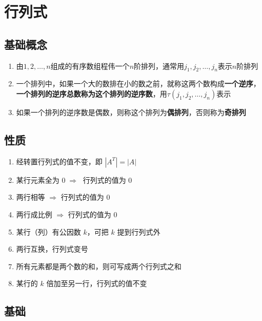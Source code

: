 \documentclass[a4paper,12pt]{article}
\begin{document}



    \section{行列式}

    \subsection{基础概念}
    \begin{enumerate}
        \item 由$1, 2, \dots, n$组成的有序数组程伟一个$n$阶排列，通常用$j_1, j_2, \dots, j_n$表示$n$阶排列
        \item 一个排列中，如果一个大的数排在小的数之前，就称这两个数构成\textbf{一个逆序}，\textbf{一个排列的逆序总数称为这个排列的逆序数}，用$\tau(j_1, j_2, \dots, j_n)$表示
        \item 如果一个排列的逆序数是偶数，则称这个排列为\textbf{偶排列}，否则称为\textbf{奇排列}
    \end{enumerate}

    \subsection{性质}

    \begin{enumerate}
        \item 经转置行列式的值不变，即 $|A^T| = |A|$
        \item 某行元素全为 $0 \;\Rightarrow\;$ 行列式的值为 0
        \item 两行相等 $\Rightarrow$ 行列式的值为 0
        \item 两行成比例 $\Rightarrow$ 行列式的值为 0
        \item 某行（列）有公因数 $k$，可把 $k$ 提到行列式外
        \item 两行互换，行列式变号
        \item {}所有元素都是两个数的和，则可写成两个行列式之和
        \item 某行的 $k$ 倍加至另一行，行列式的值不变
    \end{enumerate}

    \subsection{基础}
\end{document}
